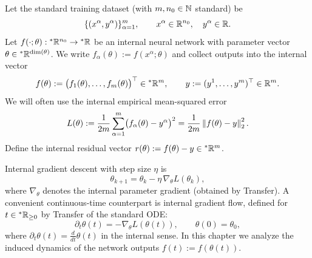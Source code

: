 Let the standard training dataset (with $m, n_0 \in \mathbb{N}$ standard) be
\begin{equation}\label{eq:ch2-dataset}
\{(x^\alpha, y^\alpha)\}_{\alpha=1}^{m}, \qquad x^\alpha \in \mathbb{R}^{n_0}, \quad y^\alpha \in \mathbb{R}.
\end{equation}
Let $f(\cdot; \theta) : {}^*\mathbb{R}^{n_0} \to {}^*\mathbb{R}$ be an internal neural network with parameter vector $\theta \in {}^*\mathbb{R}^{\dim(\theta)}$. We write $f_\alpha(\theta) := f(x^\alpha; \theta)$ and collect outputs into the internal vector
\begin{equation}\label{eq:ch2-f-y-vec}
f(\theta) := \bigl(f_1(\theta), \dots, f_m(\theta)\bigr)^\top \in {}^*\mathbb{R}^m, \qquad y := (y^1, \dots, y^m)^\top \in \mathbb{R}^m.
\end{equation}
We will often use the internal empirical mean-squared error
\begin{equation}\label{eq:ch2-mse-loss}
L(\theta) := \frac{1}{2m} \sum_{\alpha=1}^{m} \bigl(f_\alpha(\theta) - y^\alpha\bigr)^2 = \frac{1}{2m} \left\lVert f(\theta) - y \right\rVert_2^2.
\end{equation}
Define the internal residual vector $r(\theta) := f(\theta) - y \in {}^*\mathbb{R}^m$.

Internal gradient descent with step size $\eta$ is
\begin{equation}\label{eq:ch2-gd}
\theta_{k+1} = \theta_k - \eta \, \nabla_\theta L(\theta_k),
\end{equation}
where $\nabla_\theta$ denotes the internal parameter gradient (obtained by Transfer). A convenient continuous-time counterpart is internal gradient flow, defined for $t \in {}^*\mathbb{R}_{\ge 0}$ by Transfer of the standard ODE:
\begin{equation}\label{eq:ch2-gf}
\partial_t \theta(t) = -\nabla_\theta L(\theta(t)), \qquad \theta(0) = \theta_0,
\end{equation}
where $\partial_t \theta(t) = \frac{d}{dt}\theta(t)$ in the internal sense. In this chapter we analyze the induced dynamics of the network outputs $f(t) := f(\theta(t))$.

